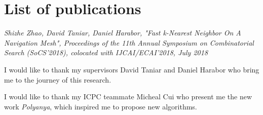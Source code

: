 \documentclass[a4paper,pdflatex,11pt,mitminorthesis,singlespace,oneside]{cssethesis}
\theoremstyle{remark}
\theoremstyle{definition}
\begin{document}
\frontmatter					%
\thesistitlepage				%
\thesiscopyrightpage			%
\tableofcontents				%
\pagebreak

\begin{thesisabstract}			%

\end{thesisabstract}                 

\chapter*{List of publications}{
\textit{Shizhe Zhao, David Taniar, Daniel Harabor, "Fast k-Nearest Neighbor On A Navigation
Mesh", Proceedings of the 11th Annual Symposium on Combinatorial Search (SoCS’2018), colocated with
IJCAI/ECAI’2018, July 2018}
}


\begin{thesisacknowledgments}	%
I would like to thank my supervisors David Taniar and
  Daniel Harabor who bring me to the journey of this research.

\noindent
  I would like to thank my ICPC teammate Micheal Cui who present me the new work
  \textit{Polyanya}, which inspired me to propose new algorithms.

\end{thesisacknowledgments}  

\mainmatter						%







\pagebreak



\end{document}
